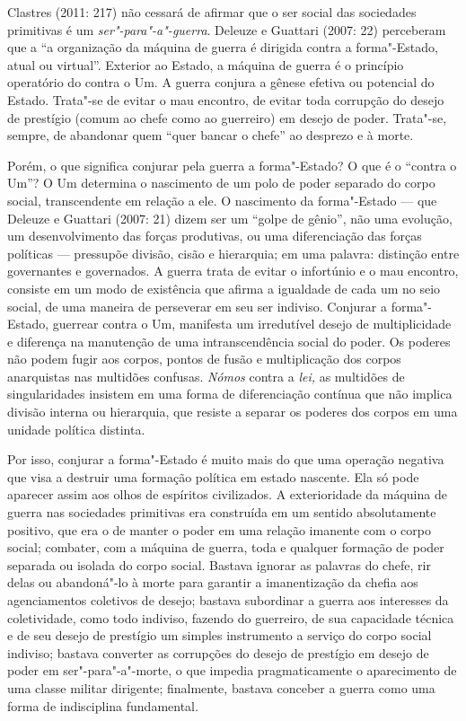 Clastres (2011: 217) não cessará de afirmar que o ser social das
sociedades primitivas é um \emph{ser"-para"-a"-guerra}. Deleuze e Guattari
(2007: 22) perceberam que a ``a organização da máquina de guerra é
dirigida contra a forma"-Estado, atual ou virtual''. Exterior ao Estado,
a máquina de guerra é o princípio operatório do contra o Um. A guerra
conjura a gênese efetiva ou potencial do Estado. Trata"-se de evitar o
mau encontro, de evitar toda corrupção do desejo de prestígio (comum ao
chefe como ao guerreiro) em desejo de poder. Trata"-se, sempre, de
abandonar quem ``quer bancar o chefe'' ao desprezo e à morte.

Porém, o que significa conjurar pela guerra a forma"-Estado? O que é o
``contra o Um''? O Um determina o nascimento de um polo de poder
separado do corpo social, transcendente em relação a ele. O nascimento
da forma"-Estado --- que Deleuze e Guattari (2007: 21) dizem ser um
``golpe de gênio'', não uma evolução, um desenvolvimento das forças
produtivas, ou uma diferenciação das forças políticas --- pressupõe
divisão, cisão e hierarquia; em uma palavra: distinção entre governantes
e governados. A guerra trata de evitar o infortúnio e o mau encontro,
consiste em um modo de existência que afirma a igualdade de cada um no
seio social, de uma maneira de perseverar em seu ser indiviso. Conjurar
a forma"-Estado, guerrear contra o Um, manifesta um irredutível desejo de
multiplicidade e diferença na manutenção de uma intranscendência social
do poder. Os poderes não podem fugir aos corpos, pontos de fusão e
multiplicação dos corpos anarquistas nas multidões confusas. \emph{Nómos
}contra a \emph{lei, }as multidões de singularidades insistem em uma
forma de diferenciação contínua que não implica divisão interna ou
hierarquia, que resiste a separar os poderes dos corpos em uma unidade
política distinta.

Por isso, conjurar a forma"-Estado é muito mais do que uma operação
negativa que visa a destruir uma formação política em estado nascente.
Ela só pode aparecer assim aos olhos de espíritos civilizados. A
exterioridade da máquina de guerra nas sociedades primitivas era
construída em um sentido absolutamente positivo, que era o de manter o
poder em uma relação imanente com o corpo social; combater, com a
máquina de guerra, toda e qualquer formação de poder separada ou isolada
do corpo social. Bastava ignorar as palavras do chefe, rir delas ou
abandoná"-lo à morte para garantir a imanentização da chefia aos
agenciamentos coletivos de desejo; bastava subordinar a guerra aos
interesses da coletividade, como todo indiviso, fazendo do guerreiro, de
sua capacidade técnica e de seu desejo de prestígio um simples
instrumento a serviço do corpo social indiviso; bastava converter as
corrupções do desejo de prestígio em desejo de poder em
ser"-para"-a"-morte, o que impedia pragmaticamente o aparecimento de uma
classe militar dirigente; finalmente, bastava conceber a guerra como uma
forma de indisciplina fundamental.

